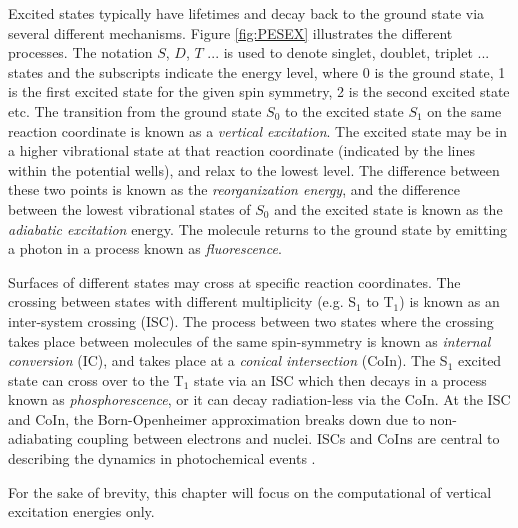Excited states typically have lifetimes and decay back to the ground state via several different mechanisms. Figure \ref{fig:PESEX} illustrates the different processes. The notation $S$, $D$, $T$ ... is used to denote singlet, doublet, triplet ... states and the subscripts indicate the energy level, where 0 is the ground state, 1 is the first excited state for the given spin symmetry, 2 is the second excited state etc. The transition from the ground state $S_0$ to the excited state $S_1$ on the same reaction coordinate is known as a \emph{vertical excitation}. The excited state may be in a higher vibrational state at that reaction coordinate (indicated by the lines within the potential wells), and relax to the lowest level. The difference between these two points is known as the \emph{reorganization energy}, and the difference between the lowest vibrational states of $S_0$ and the excited state is known as the \emph{adiabatic excitation} energy. The 
molecule returns to the ground state by emitting a photon in a process known as \emph{fluorescence}. 

Surfaces of different states may cross at specific reaction coordinates. The crossing between states with different multiplicity (e.g. S$_1$ to T$_1$) is known as an inter-system crossing (ISC). The process between two states where the crossing takes place between molecules of the same spin-symmetry is known as \emph{internal conversion} (IC), and takes place at a \emph{conical intersection} (CoIn). The S$_1$ excited state can cross over to the T$_1$ state via an ISC which then decays in a process known as \emph{phosphorescence}, or it can decay radiation-less via the CoIn. At the ISC and CoIn, the Born-Openheimer approximation breaks down due to non-adiabating coupling between electrons and nuclei. ISCs and CoIns are central to describing the dynamics in photochemical events \cite{Mig2008,Mat2011,Kim2015,Zhu2016}.

For the sake of brevity, this chapter will focus on the computational of vertical excitation energies only.

